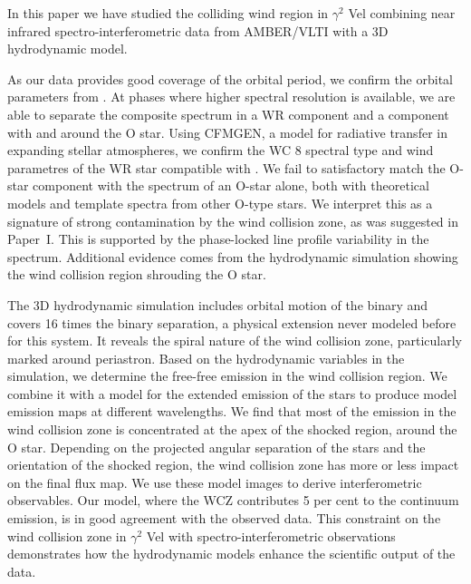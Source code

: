 \documentclass[usenatbib]{mnras}%
\begin{document}
In this paper we have studied the colliding wind region in $\gamma^2$ Vel combining near infrared spectro-interferometric data from AMBER/VLTI with a 3D hydrodynamic model.

As our data provides good coverage of the orbital period, we confirm the orbital parameters from \citet{2007MNRAS.377..415N}. At phases where higher spectral resolution is available, we are able to separate the composite spectrum in a WR component and a component with and around the O star. Using CFMGEN, a model for radiative transfer in expanding stellar atmospheres, we confirm the WC 8 spectral type and wind parametres of the WR star compatible with \citet{2000A&A...358..187D}. We fail to satisfactory match the O-star component with the spectrum of an O-star alone, both with theoretical models and template spectra from other O-type stars. We interpret this as a signature of strong contamination by the wind collision zone, as was suggested in Paper~I. This is supported by the phase-locked line profile variability in the spectrum. Additional evidence comes from the hydrodynamic simulation showing the wind collision region shrouding  the O star. 

The 3D hydrodynamic simulation includes orbital motion of the binary and covers 16 times the binary separation, a physical extension never modeled before for this system. It reveals the spiral nature of the wind collision zone, particularly marked around periastron. Based on the hydrodynamic variables in the simulation, we determine the free-free emission in the wind collision region. We combine it with a model for the extended emission of the stars to produce model emission maps at different wavelengths. We find that most of the emission in the wind collision zone is concentrated at the apex of the shocked region, around the O star. Depending on the projected angular separation of the stars and the orientation of the shocked region, the wind collision zone has more or less impact on the final flux map. We use these model images to derive interferometric observables. Our model, where the WCZ contributes 5 per cent to the continuum emission, is in good agreement with the observed data. This constraint on the wind collision zone in $\gamma^2$ Vel with spectro-interferometric observations demonstrates how the hydrodynamic models enhance the scientific output of the data.
\end{document}
